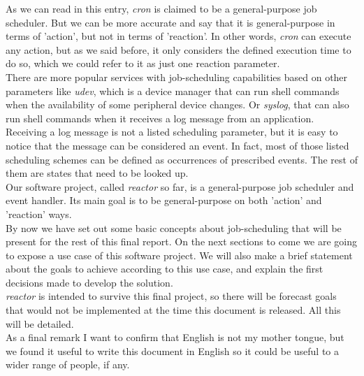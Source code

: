 As we can read in this entry, \emph{cron} is claimed to be a general-purpose job scheduler. But we can be more accurate and say that it is 
general-purpose in terms of 'action', but not in terms of 'reaction'. In other words, \emph{cron} can execute any action, but as we 
said before, it only considers the defined execution time to do so, which we could refer to it as just one reaction parameter.\\
There are more popular services with job-scheduling capabilities based on other parameters like \emph{udev}, which is a device manager that 
can run shell commands when the availability of some peripheral device changes. Or \emph{syslog}, that can also run shell commands when 
it receives a log message from an application. Receiving a log message is not a listed scheduling parameter, but it is easy to notice that
the message can be considered an event. In fact, most of those listed scheduling schemes can be defined as occurrences of prescribed 
events. The rest of them are states that need to be looked up.\\
Our software project, called \emph{reactor} so far, is a general-purpose job scheduler and event handler. Its main goal is to be 
general-purpose on both 'action' and 'reaction' ways.
\\
By now we have set out some basic concepts about job-scheduling that will be present for the rest of this final report. On the next 
sections to come we are going to expose a use case of this software project. We will also make a brief statement about the goals to 
achieve according to this use case, and explain the first decisions made to develop the solution.\\
\emph{reactor} is intended to survive this final project, so there will be forecast goals that would not be implemented at the time this 
document is released. All this will be detailed.\\
As a final remark I want to confirm that English is not my mother tongue, but we found it useful to write this document in English so it
could be useful to a wider range of people, if any.


